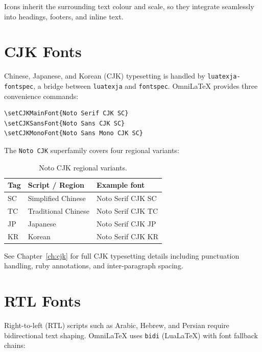Icons inherit the surrounding text colour and scale, so they integrate
seamlessly into headings, footers, and inline text.

\section{CJK Fonts}

Chinese, Japanese, and Korean (CJK) typesetting is handled by
\texttt{luatexja-fontspec}, a bridge between \texttt{luatexja} and
\texttt{fontspec}.  OmniLaTeX provides three convenience commands:

\begin{verbatim}
\setCJKMainFont{Noto Serif CJK SC}
\setCJKSansFont{Noto Sans CJK SC}
\setCJKMonoFont{Noto Sans Mono CJK SC}
\end{verbatim}

The \texttt{Noto CJK} superfamily covers four regional variants:

\begin{table}[htbp]
  \centering
  \caption{Noto CJK regional variants.}
  \label{tab:cjk-variants}
  \begin{tabular}{@{}lll@{}}
    \toprule
    Tag & Script / Region     & Example font              \\
    \midrule
    SC  & Simplified Chinese  & Noto Serif CJK SC         \\
    TC  & Traditional Chinese & Noto Serif CJK TC         \\
    JP  & Japanese            & Noto Serif CJK JP         \\
    KR  & Korean              & Noto Serif CJK KR         \\
    \bottomrule
  \end{tabular}
\end{table}

See Chapter~\ref{ch:cjk} for full CJK typesetting details including
punctuation handling, ruby annotations, and inter-paragraph spacing.

\section{RTL Fonts}

Right-to-left (RTL) scripts such as Arabic, Hebrew, and Persian require
bidirectional text shaping.  OmniLaTeX uses \texttt{bidi} (LuaLaTeX) with
font fallback chains:

